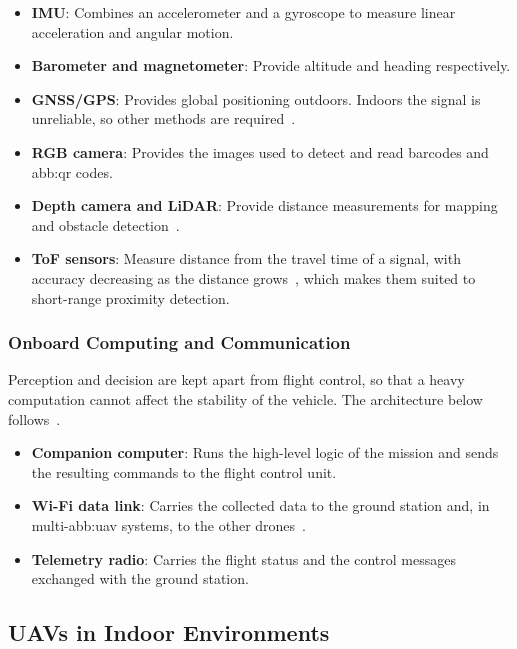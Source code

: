 \begin{itemize}[itemsep=0.4em]
    \item \textbf{IMU}: Combines an accelerometer and a gyroscope to measure
          linear acceleration and angular motion.
    \item \textbf{Barometer and magnetometer}: Provide altitude and heading
          respectively.
    \item \textbf{GNSS/GPS}: Provides global positioning outdoors. Indoors the
          signal is unreliable, so other methods are
          required~\cite{pore2026uavqr}.
    \item \textbf{RGB camera}: Provides the images used to detect and read
          barcodes and \gls{abb:qr} codes.
    \item \textbf{Depth camera and LiDAR}: Provide distance measurements for
          mapping and obstacle detection~\cite{chang2023review}.
    \item \textbf{ToF sensors}: Measure distance from the travel time of a
          signal, with accuracy decreasing as the distance
          grows~\cite{tejeroruiz2024realistic}, which makes them suited to
          short-range proximity detection.
\end{itemize}

\subsubsection*{Onboard Computing and Communication}

Perception and decision are kept apart from flight control, so that a heavy
computation cannot affect the stability of the vehicle. The architecture below
follows~\cite{acharya2020cornet}.

\begin{itemize}[itemsep=0.4em]
    \item \textbf{Companion computer}: Runs the high-level logic of the mission
          and sends the resulting commands to the flight control unit.
    \item \textbf{Wi-Fi data link}: Carries the collected data to the ground
          station and, in multi-\gls{abb:uav} systems, to the other
          drones~\cite{chandran2024network}.
    \item \textbf{Telemetry radio}: Carries the flight status and the control
          messages exchanged with the ground station.
\end{itemize}


\subsection{UAVs in Indoor Environments}%
\label{subsec:bg:uav-indoor}

